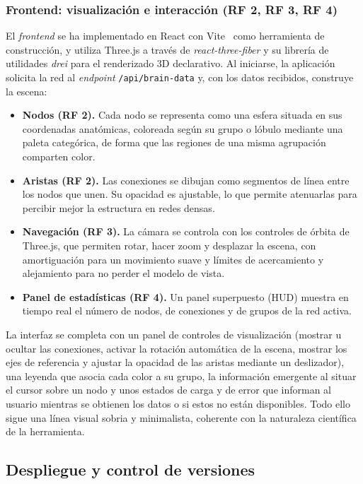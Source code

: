 \subsubsection*{Frontend: visualización e interacción (RF 2, RF 3, RF 4)}

El \textit{frontend} se ha implementado en React con Vite~\cite{vite} como herramienta de construcción, y utiliza
Three.js a través de \textit{react-three-fiber} y su librería de utilidades \textit{drei} para el
renderizado 3D declarativo. Al iniciarse, la aplicación solicita la red al \textit{endpoint}
\texttt{/api/brain-data} y, con los datos recibidos, construye la escena:

\begin{itemize}
	\item \textbf{Nodos (RF 2).} Cada nodo se representa como una esfera situada en sus coordenadas
		anatómicas, coloreada según su grupo o lóbulo mediante una paleta categórica, de forma que las
		regiones de una misma agrupación comparten color.
	\item \textbf{Aristas (RF 2).} Las conexiones se dibujan como segmentos de línea entre los nodos
		que unen. Su opacidad es ajustable, lo que permite atenuarlas para percibir mejor la estructura
		en redes densas.
	\item \textbf{Navegación (RF 3).} La cámara se controla con los controles de órbita de Three.js,
		que permiten rotar, hacer zoom y desplazar la escena, con amortiguación para un movimiento
		suave y límites de acercamiento y alejamiento para no perder el modelo de vista.
	\item \textbf{Panel de estadísticas (RF 4).} Un panel superpuesto (HUD) muestra en tiempo real el
		número de nodos, de conexiones y de grupos de la red activa.
\end{itemize}

La interfaz se completa con un panel de controles de visualización (mostrar u ocultar las conexiones,
activar la rotación automática de la escena, mostrar los ejes de referencia y ajustar la opacidad de
las aristas mediante un deslizador), una leyenda que asocia cada color a su grupo, la información
emergente al situar el cursor sobre un nodo y unos estados de carga y de error que informan al usuario
mientras se obtienen los datos o si estos no están disponibles. Todo ello sigue una línea visual sobria
y minimalista, coherente con la naturaleza científica de la herramienta.

\subsection{Despliegue y control de versiones}

